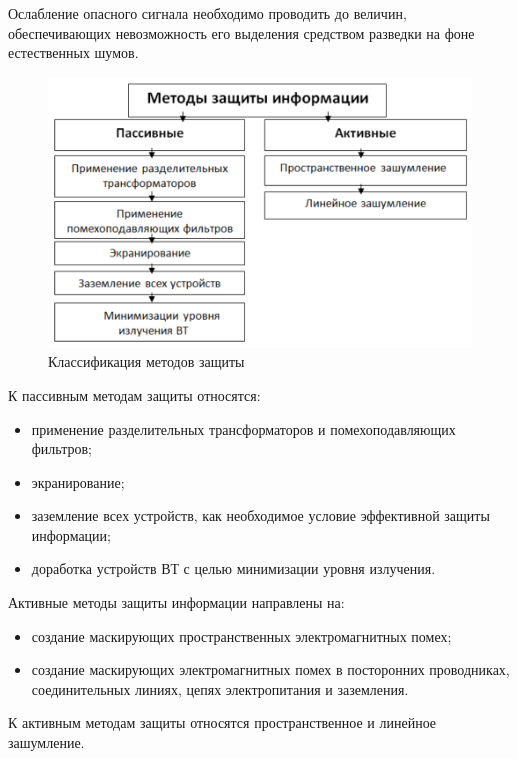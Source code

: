 Ослабление опасного сигнала необходимо проводить до величин, обеспечивающих невозможность его выделения средством разведки на фоне естественных шумов.

\begin{figure}[H]
	\centering
	\includegraphics{"img/defence"}
	\caption{Классификация методов защиты}
\end{figure}


К пассивным методам защиты относятся:
\begin{itemize}
	\item применение разделительных трансформаторов и помехоподавляющих фильтров;
	\item экранирование;
	\item заземление всех устройств, как необходимое условие эффективной защиты информации;
	\item доработка устройств ВТ с целью минимизации уровня излучения.
\end{itemize}

Активные методы защиты информации направлены на:
\begin{itemize}
\item создание маскирующих пространственных электромагнитных помех;
\item создание маскирующих электромагнитных помех в посторонних проводниках, соединительных линиях, цепях электропитания и заземления.
\end{itemize}

К активным методам защиты относятся пространственное и линейное зашумление.
